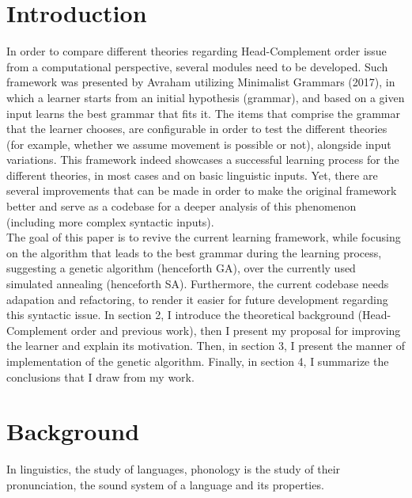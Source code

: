 \documentclass{article}
\begin{document}
\section{Introduction} 
In order to compare different theories regarding Head-Complement order issue from a computational perspective, several modules need to be developed. Such framework was presented by Avraham utilizing Minimalist Grammars (2017),  in which a learner starts from an initial hypothesis (grammar), and based on a given input learns the best grammar that fits it. The items that comprise the grammar that the learner chooses, are configurable in order to test the different theories (for example, whether we assume movement is possible or not), alongside input variations. This framework indeed showcases a successful learning process for the different theories, in most cases and on basic linguistic inputs. Yet,  there are several improvements that can be made in order to make the original framework better and serve as a codebase for a deeper analysis of this phenomenon (including more complex syntactic inputs). \\

The goal of this paper is to revive the current learning framework, while focusing on the algorithm that leads to the best grammar during the learning process, suggesting a genetic algorithm (henceforth GA), over the currently used simulated annealing (henceforth SA). Furthermore,  the current codebase needs adapation and refactoring, to render it easier for future development regarding this syntactic issue.
In section 2, I introduce the theoretical background (Head-Complement order and previous work),  then I present my proposal for improving the learner and explain its motivation.  Then,  in section 3,  I present the manner of implementation of the genetic algorithm. Finally,  in section 4,  I summarize the conclusions that I draw from my work.

\clearpage
\section{Background} 
In linguistics, the study of languages, phonology is the study of their pronunciation,  the sound system of a language and its properties.
\end{document}
